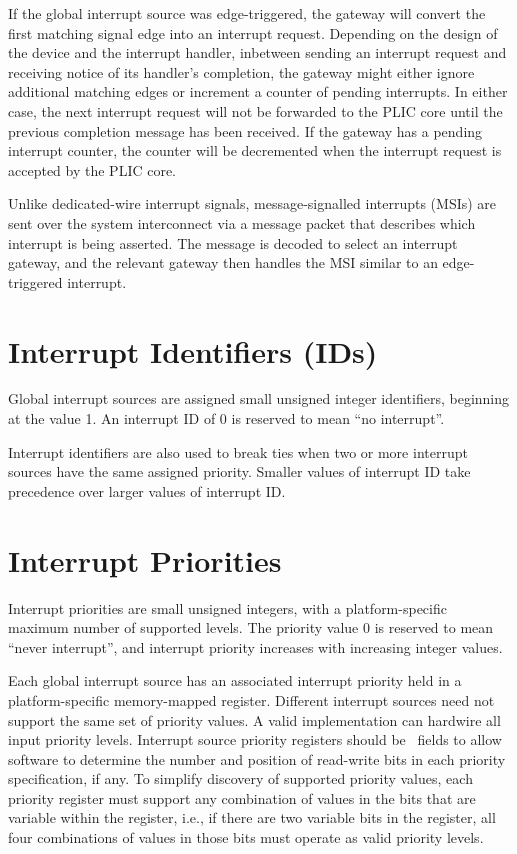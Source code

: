 If the global interrupt source was edge-triggered, the gateway will
convert the first matching signal edge into an interrupt request.
Depending on the design of the device and the interrupt handler,
inbetween sending an interrupt request and receiving notice of its
handler's completion, the gateway might either ignore additional
matching edges or increment a counter of pending interrupts.  In
either case, the next interrupt request will not be forwarded to the
PLIC core until the previous completion message has been received.  If
the gateway has a pending interrupt counter, the counter will be
decremented when the interrupt request is accepted by the PLIC core.

Unlike dedicated-wire interrupt signals, message-signalled interrupts
(MSIs) are sent over the system interconnect via a message packet that
describes which interrupt is being asserted.  The message is decoded
to select an interrupt gateway, and the relevant gateway then handles
the MSI similar to an edge-triggered interrupt.

\section{Interrupt Identifiers (IDs)}

Global interrupt sources are assigned small unsigned integer
identifiers, beginning at the value 1.  An interrupt ID of 0 is
reserved to mean ``no interrupt''.

Interrupt identifiers are also used to break ties when two or more
interrupt sources have the same assigned priority.  Smaller values of
interrupt ID take precedence over larger values of interrupt ID.

\section{Interrupt Priorities}

Interrupt priorities are small unsigned integers, with a
platform-specific maximum number of supported levels.  The priority
value 0 is reserved to mean ``never interrupt'', and interrupt
priority increases with increasing integer values.

Each global interrupt source has an associated interrupt priority held
in a platform-specific memory-mapped register.  Different interrupt
sources need not support the same set of priority values.  A valid
implementation can hardwire all input priority levels.  Interrupt
source priority registers should be \warl\ fields to allow software to
determine the number and position of read-write bits in each priority
specification, if any.  To simplify discovery of supported priority
values, each priority register must support any combination of values
in the bits that are variable within the register, i.e., if there are
two variable bits in the register, all four combinations of values in
those bits must operate as valid priority levels.

